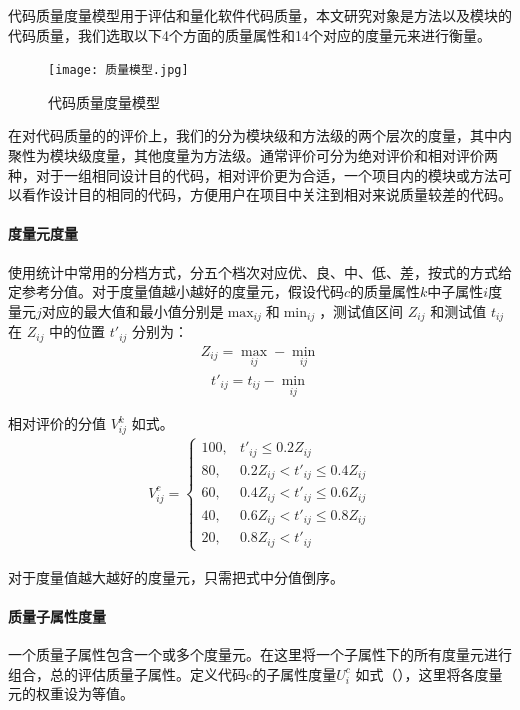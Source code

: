 代码质量度量模型用于评估和量化软件代码质量，本文研究对象是方法以及模块的代码质量，我们选取以下4个方面的质量属性和14个对应的度量元来进行衡量。

\begin{figure}[h]
\centering
\texttt{[image: 质量模型.jpg]}
\caption{代码质量度量模型}
\end{figure}

在对代码质量的的评价上，我们的分为模块级和方法级的两个层次的度量，其中内聚性为模块级度量，其他度量为方法级。通常评价可分为绝对评价和相对评价两种，对于一组相同设计目的代码，相对评价更为合适\cite{黄沛杰2011代码质量静态度量的研究与应用}，一个项目内的模块或方法可以看作设计目的相同的代码，方便用户在项目中关注到相对来说质量较差的代码。

\paragraph{度量元度量} 使用统计中常用的分档方式，分五个档次对应优、良、中、低、差，按式的方式给定参考分值。对于度量值越小越好的度量元，假设代码$c$的质量属性$k$中子属性$i$度量元$j$对应的最大值和最小值分别是$\max_{ij}$和$\min_{ij}$，测试值区间 \(Z_{ij}\) 和测试值 \(t_{ij}\) 在 \(Z_{ij}\) 中的位置 \(t'_{ij}\) 分别为：
\begin{align}
Z_{ij} = \max_{ij} - \min_{ij}
\end{align}
\begin{align}
t'_{ij} = t_{ij} - \min_{ij}
\end{align}

相对评价的分值 \(V_{ij}^k\) 如式。
\begin{align}
V_{ij}^c = 
\begin{cases} 
100, & t'_{ij} \leq 0.2Z_{ij} \\ 
80, & 0.2Z_{ij} < t'_{ij} \leq 0.4Z_{ij} \\ 
60, & 0.4Z_{ij} < t'_{ij} \leq 0.6Z_{ij} \\ 
40, & 0.6Z_{ij} < t'_{ij} \leq 0.8Z_{ij} \\ 
20, & 0.8Z_{ij} < t'_{ij}
\end{cases}
\end{align}

对于度量值越大越好的度量元，只需把式中分值倒序。

\paragraph{质量子属性度量} 一个质量子属性包含一个或多个度量元。在这里将一个子属性下的所有度量元进行组合，总的评估质量子属性。定义代码c的子属性度量$U_{i}^c$ 如式（），这里将各度量元的权重设为等值。

